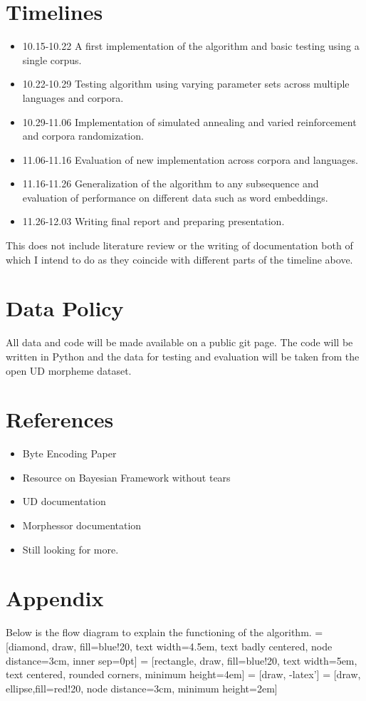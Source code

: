 \documentclass[11pt,a4paper]{article}
\begin{document}
\section{Timelines}
\begin{itemize}
        \item 10.15-10.22 A first implementation of the algorithm and basic
                testing using a single corpus.
        \item 10.22-10.29 Testing algorithm using varying parameter sets 
                across multiple languages and corpora.
        \item 10.29-11.06 Implementation of simulated annealing and varied
                reinforcement and corpora randomization.
        \item 11.06-11.16 Evaluation of new implementation across corpora
                and languages.
        \item 11.16-11.26 Generalization of the algorithm to any subsequence
               and evaluation of performance on different data such as word
               embeddings.
       \item 11.26-12.03 Writing final report and preparing presentation.
\end{itemize}
This does not include literature review or the writing of documentation both 
of which I intend to do as they coincide with different parts of the timeline 
above.
\section{Data Policy}
All data and code will be made available on a public git page. The code will 
be written in Python and the data for testing and evaluation will be taken
from the open UD morpheme dataset.
\section{References}
\begin{itemize}
        \item Byte Encoding Paper
        \item Resource on Bayesian Framework without tears
        \item UD documentation
        \item Morphessor documentation
        \item Still looking for more.
\end{itemize}
\section{Appendix}
Below is the flow diagram to explain the functioning of the algorithm.
 = [diamond, draw, fill=blue!20,
    text width=4.5em, text badly centered, node distance=3cm, inner sep=0pt]
 = [rectangle, draw, fill=blue!20,
    text width=5em, text centered, rounded corners, minimum height=4em]
 = [draw, -latex']
 = [draw, ellipse,fill=red!20, node distance=3cm,
    minimum height=2em]
\end{document}
